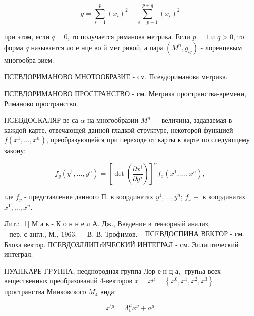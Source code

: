\documentclass[10pt]{article}
\begin{document}
\[

g=\sum_{s=1}^{p}\left(x_{i}\right)^{2}-\sum_{s=p+1}^{p+q}\left(x_{i}\right)^{2}

\]



при этом, если $q=0$, то получается риманова метрика. Если $p=1$ и $q>0$, то форма $q$ называется ло е нце во й мет рикой, а пара $\left(M^{n}, g_{i j}\right)$ - лоренцевым многообра зием.



ПСЕВДОРИМАНОВО МНОТООБРАЗИЕ - см. Псевдориманова метрика.



ПСЕВДОРИМАНОВО ПРОСТРАНСТВО - см. Метрика пространства-времени, Риманово пространство.



ПСEВДОСКАЛЯР ве са $\alpha$ на многообразии $M^{n}-$ величина, задаваемая в каждой карте, отвечающей данной гладкой структуре, некоторой функцией $f\left(x^{1}, \ldots, x^{n}\right)$, преобразующейся при переходе от карты к карте по следующему закону:



\[

f_{y}\left(y^{1}, \ldots, y^{n}\right)=\left[\operatorname{det}\left(\frac{\partial x^{i}}{\partial y^{j}}\right)\right]^{\alpha} f_{x}\left(x^{1}, \ldots, x^{n}\right),

\]



где $f_{y}$ - представление данного П. в координатах $y^{1}, \ldots, y^{n}$; $f_{x}-$ в координатах $x^{1}, \ldots, x^{n}$.



Лит.: [1] М а к - К о н н е л А. Дж., Введение в тензорный анализ, $\begin{array}{ll}\text { пер. с англ., М., 1963. } & \text { В. В. Трофимов. }\end{array}$ ПСEВДОСПИНА ВЕКТОР - см. Блоха вектор. ПСЕВДОЗЛЛИПтИЧЕСКИЙ ИНТЕГРАЛ - см. Эллиптический интеграл.



ПУАНKАРЕ ГPУППА, неоднородная группа Лор е н ц а,- групnа всех вещественных преобразований 4-векторов $x=x^{\mu}=\left\{x^{0}, x^{1}, x^{2}, x^{3}\right\}$ пространства Минковского $M_{4}$ вида:



\[

x^{\prime \mu}=\Lambda_{v}^{\mu} x^{\nu}+a^{\mu}

\]
\end{document}
